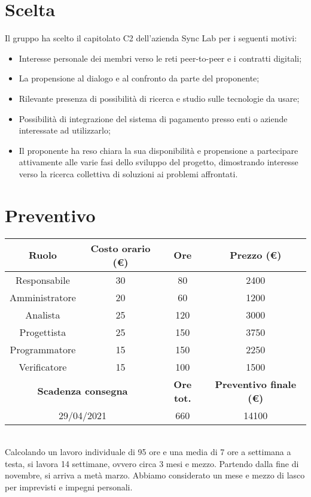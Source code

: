 \documentclass[a4paper, 12pt]{article}
\begin{document}
\makefrontpage

\section{Scelta}\label{scelta}
Il gruppo ha scelto il capitolato C2 dell’azienda Sync Lab per i seguenti motivi:
\begin{itemize}
\item Interesse personale dei membri verso le reti peer-to-peer e i contratti digitali;
\item La propensione al dialogo e al confronto da parte del proponente;
\item Rilevante presenza di possibilità di ricerca e studio sulle tecnologie da usare;
\item Possibilità di integrazione del sistema di pagamento presso enti o aziende interessate ad utilizzarlo;
\item Il proponente ha reso chiara la sua disponibilità e propensione a partecipare attivamente alle varie fasi dello sviluppo del progetto, dimostrando interesse verso la ricerca collettiva di soluzioni ai problemi affrontati.
\end{itemize}

\section{Preventivo}\label{preventivo}
\begin{tabular}{|c|c|c|c|}
    \hline
    \textbf{Ruolo} & \textbf{Costo orario (\euro)} & \textbf{Ore} & \textbf{Prezzo (\euro)}\\
    \hline
    Responsabile & 30 & 80 & 2400\\
    \hline
    Amministratore & 20 & 60 & 1200\\
    \hline
    Analista & 25 & 120 & 3000\\
    \hline
    Progettista & 25 & 150 & 3750\\
    \hline
    Programmatore & 15 & 150 & 2250\\
    \hline
    Verificatore & 15 & 100 & 1500\\
    \hline\hline
    \multicolumn{2}{|c|}{\textbf{Scadenza consegna}} & \textbf{Ore tot.} & \textbf{Preventivo finale (\euro)}\\
    \hline
    \multicolumn{2}{|c|}{29/04/2021} & 660 & 14100\\
    \hline
\end{tabular}\\[8pt]

Calcolando un lavoro individuale di 95 ore e una media di 7 ore a settimana a testa, si lavora 14 settimane, ovvero circa 3 mesi e mezzo.
Partendo dalla fine di novembre, si arriva a metà marzo. Abbiamo considerato un mese e mezzo di lasco per imprevisti e impegni personali.
\end{document}
